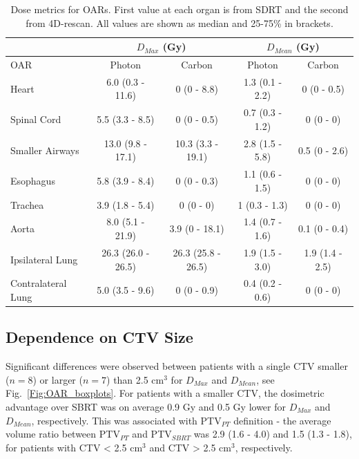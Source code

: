 \begin{table}[H]
  \centering
  \caption{Dose metrics for OARs. First value at each organ is from SDRT and the second from 4D-rescan. All values are shown as median and 25-75\% in brackets.}
  \begin{tabular}{l|c|c|c|c|}
    \cline{2-5}
     & \multicolumn{2}{|c|}{$D_{Max}$ (Gy)} & \multicolumn{2}{|c|}{$D_{Mean}$ (Gy)} \\
     \hline
    \multicolumn{1}{|l|}{OAR} & Photon & Carbon & Photon & Carbon	\\
    \hline
\multicolumn{1}{|l|}{Heart} & 6.0 (0.3 - 11.6) & 0 (0 - 8.8)	& 1.3 (0.1 - 2.2) & 	0 (0 - 0.5) \\
\multicolumn{1}{|l|}{Spinal Cord} &	5.5 (3.3 - 8.5)	& 0 (0 - 0.5) &	0.7 (0.3 - 1.2) &	0 (0 - 0) \\
\multicolumn{1}{|l|}{Smaller Airways} & 13.0 (9.8 - 17.1) &	10.3 (3.3 - 19.1) &	2.8 (1.5 - 5.8) &	0.5 (0 - 2.6) \\
\multicolumn{1}{|l|}{Esophagus} & 5.8 (3.9 - 8.4) &	0 (0 - 0.3) &	1.1 (0.6 - 1.5) &	0 (0 - 0)\\
\multicolumn{1}{|l|}{Trachea} &3.9 (1.8 - 5.4) &	0 (0 - 0) &	1 (0.3 - 1.3) &	0 (0 - 0)\\
\multicolumn{1}{|l|}{Aorta} & 8.0 (5.1 - 21.9) &	3.9 (0 - 18.1) &	1.4 (0.7 - 1.6) &	0.1 (0 - 0.4)\\
\multicolumn{1}{|l|}{Ipsilateral Lung} & 26.3 (26.0 - 26.5) &	26.3 (25.8 - 26.5) &	1.9 (1.5 - 3.0) &	1.9 (1.4 - 2.5)\\
\multicolumn{1}{|l|}{Contralateral Lung} & 5.0 (3.5 - 9.6) &	0 (0 - 0.9) &	0.4 (0.2 - 0.6) &	0 (0 - 0) \\
    \hline\hline
  \end{tabular}
  \label{tab:results}
\end{table}




\subsection{Dependence on CTV Size}

Significant differences were observed between patients with a single CTV smaller ($n=8$) or larger ($n=7$) than 2.5 cm$^{3}$ for $D_{Max}$ and $D_{Mean}$, see Fig.~\ref{Fig:OAR_boxplots}. For patients with a smaller CTV, the dosimetric advantage over SBRT was on average 0.9 Gy and 0.5 Gy lower for $D_{Max}$ and $D_{Mean}$, respectively. This was associated with PTV$_{PT}$ definition - the average volume ratio between PTV$_{PT}$ and PTV$_{SBRT}$ was 2.9 (1.6 - 4.0) and 1.5 (1.3 - 1.8), for patients with CTV < 2.5 cm$^{3}$ and CTV > 2.5 cm$^{3}$, respectively.

